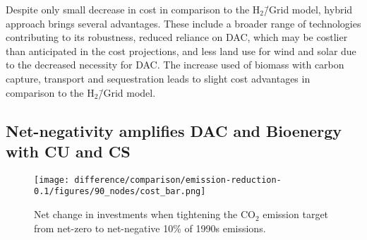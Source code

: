 \documentclass[twocolumn]{article}
\newcommand{\COtwo}{CO$_2$}
\newcommand{\modH}{H$_2$\=/Grid model}
\begin{document}
Despite only small decrease in cost in comparison to the \modH{}, hybrid approach brings several advantages. These include a broader range of technologies contributing to its robustness, reduced reliance on DAC, which may be costlier than anticipated in the cost projections, and less land use for wind and solar due to the decreased necessity for DAC. The increase used of biomass with carbon capture, transport and sequestration leads to slight cost advantages in comparison to the \modH{}.



\subsection*{Net-negativity amplifies DAC and Bioenergy with CU and CS}\label{subsec:NN}

\begin{figure}[htb!]
    \centering
    \texttt{[image: difference/comparison/emission-reduction-0.1/figures/90\_nodes/cost\_bar.png]}
    \caption[short]{Net change in investments when tightening the \COtwo{} emission target from net-zero to net-negative 10\% of 1990s emissions.}
    \label{fig:net-negative_cost_bar}
\end{figure}
\end{document}
